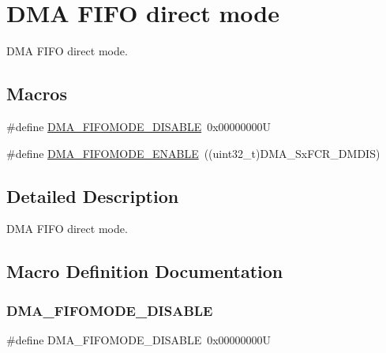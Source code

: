 \hypertarget{group___d_m_a___f_i_f_o__direct__mode}{}\section{D\+MA F\+I\+FO direct mode}
\label{group___d_m_a___f_i_f_o__direct__mode}


D\+MA F\+I\+FO direct mode.  


\subsection*{Macros}
\begin{DoxyCompactItemize}
\item 
\#define \mbox{\hyperlink{group___d_m_a___f_i_f_o__direct__mode_gaec22b199f9da9214bf908d7edbcd83e8}{D\+M\+A\+\_\+\+F\+I\+F\+O\+M\+O\+D\+E\+\_\+\+D\+I\+S\+A\+B\+LE}}~0x00000000U
\item 
\#define \mbox{\hyperlink{group___d_m_a___f_i_f_o__direct__mode_ga18709570bed6b9112520701c482fbe4b}{D\+M\+A\+\_\+\+F\+I\+F\+O\+M\+O\+D\+E\+\_\+\+E\+N\+A\+B\+LE}}~((uint32\+\_\+t)D\+M\+A\+\_\+\+Sx\+F\+C\+R\+\_\+\+D\+M\+D\+IS)
\end{DoxyCompactItemize}


\subsection{Detailed Description}
D\+MA F\+I\+FO direct mode. 



\subsection{Macro Definition Documentation}
\mbox{\label{group___d_m_a___f_i_f_o__direct__mode_gaec22b199f9da9214bf908d7edbcd83e8}} 
\subsubsection{\texorpdfstring{D\+M\+A\+\_\+\+F\+I\+F\+O\+M\+O\+D\+E\+\_\+\+D\+I\+S\+A\+B\+LE}{DMA\_FIFOMODE\_DISABLE}}
{\footnotesize\ttfamily \#define D\+M\+A\+\_\+\+F\+I\+F\+O\+M\+O\+D\+E\+\_\+\+D\+I\+S\+A\+B\+LE~0x00000000U}

